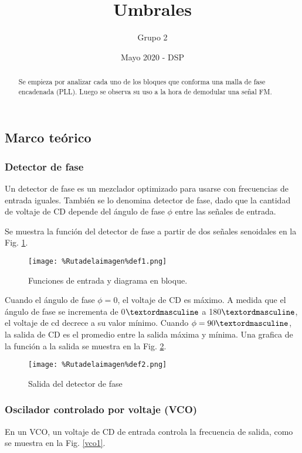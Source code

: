 \documentclass{article}
\title{Umbrales}
\author{Grupo 2}
\date{Mayo 2020 - DSP}
\begin{document}
\maketitle
\begin{abstract}
Se empieza por analizar cada uno de los bloques que conforma una malla de fase encadenada (PLL). Luego se observa su uso a la hora de demodular una señal FM. 
\end{abstract}


\subsection{Marco teórico}
\subsubsection{Detector de fase}
Un detector de fase es un mezclador optimizado para usarse con frecuencias de entrada iguales. También se lo denomina detector de fase, dado que la cantidad de voltaje de CD depende del ángulo de fase $\phi$ entre las señales de entrada.

Se muestra la función del detector de fase a partir de dos señales senoidales en la Fig. \ref{def1}.

\begin{figure}[htbp]
    \centering
    \texttt{[image: \%Rutadelaimagen\%def1.png]}
    \caption{Funciones de entrada y diagrama en bloque.}
    \label{def1}
\end{figure}

Cuando el ángulo de fase $\phi=0$, el voltaje de CD es máximo. A medida que el ángulo de fase se incrementa de 0$\textordmasculine$ a 180$\textordmasculine$, el voltaje de cd decrece a su valor mínimo. Cuando $\phi=90\textordmasculine$, la salida de CD es el promedio entre la salida máxima y mínima. Una grafica de la función a la salida se muestra en la Fig. \ref{def2}.

\begin{figure}[htbp]
    \centering
    \texttt{[image: \%Rutadelaimagen\%def2.png]}
    \caption{Salida del detector de fase}
    \label{def2}
\end{figure}

\subsubsection{Oscilador controlado por voltaje (VCO)}
En un VCO, un voltaje de CD de entrada controla la frecuencia de salida, como se muestra en la Fig. \ref{vco1}.
\end{document}
